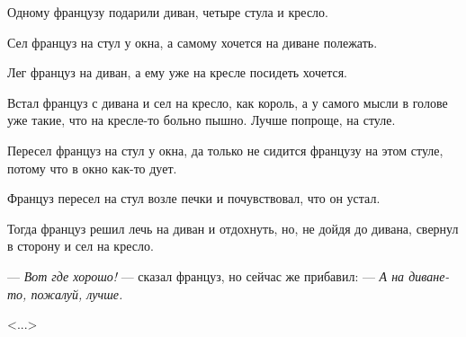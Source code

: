 Одному французу подарили диван, четыре стула и кресло.

Сел француз на стул у окна, а самому хочется на диване полежать.

Лег француз на диван, а ему уже на кресле посидеть хочется.

Встал француз с дивана и сел на кресло, как король, а у самого мысли в голове уже такие, что на кресле-то больно пышно. Лучше попроще, на стуле.

Пересел француз на стул у окна, да только не сидится французу на этом стуле, потому что в окно как-то дует.

Француз пересел на стул возле печки и почувствовал, что он устал.

Тогда француз решил лечь на диван и отдохнуть, но, не дойдя до дивана, свернул в сторону и сел на кресло.

--- \textit{Вот где хорошо!} --- сказал француз, но сейчас же прибавил: --- \textit{А на диване-то, пожалуй, лучше.}

\vspace{0.5em}
\hfill \textless ...\textgreater